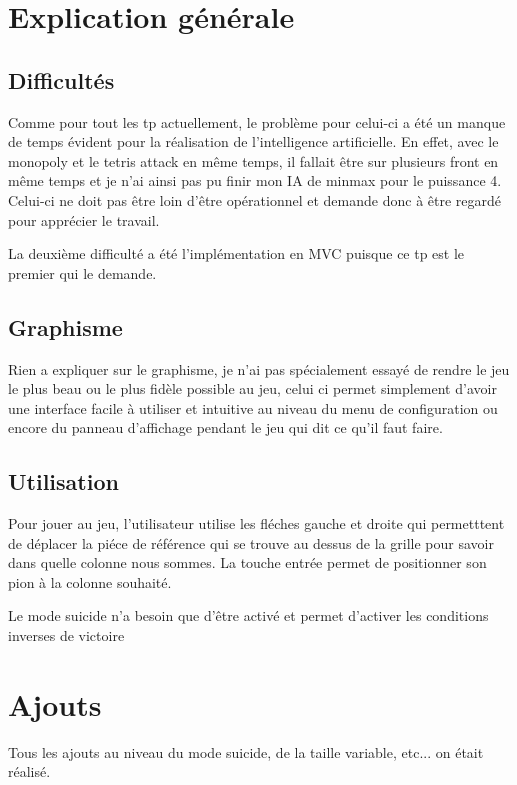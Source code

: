 \documentclass[a4paper]{article}
\date{19 Janvier 2017}
\begin{document}
\entete

\section{Explication générale}

\subsection{Difficultés}

Comme pour tout les tp actuellement, le problème pour celui-ci a été un manque de temps évident pour la réalisation de l'intelligence artificielle. En effet, avec le monopoly et le tetris attack en même temps, il fallait être sur plusieurs front en même temps et je n'ai ainsi pas pu finir mon IA de minmax pour le puissance 4. Celui-ci ne doit pas être loin d'être opérationnel et demande donc à être regardé pour apprécier le travail.

La deuxième difficulté a été l'implémentation en MVC puisque ce tp est le premier qui le demande.

\subsection{Graphisme}

Rien a expliquer sur le graphisme, je n'ai pas spécialement essayé de rendre le jeu le plus beau ou le plus fidèle possible au jeu, celui ci permet simplement d'avoir une interface facile à utiliser et intuitive au niveau du menu de configuration ou encore du panneau d'affichage pendant le jeu qui dit ce qu'il faut faire.


\subsection{Utilisation}

Pour jouer au jeu, l'utilisateur utilise les fléches gauche et droite qui permetttent de déplacer la piéce de référence qui se trouve au dessus de la grille pour savoir dans quelle colonne nous sommes. La touche entrée permet de positionner son pion à la colonne souhaité.

Le mode suicide n'a besoin que d'être activé et permet d'activer les conditions inverses de victoire

\section{Ajouts}

Tous les ajouts au niveau du mode suicide, de la taille variable, etc... on était réalisé.
\end{document}
